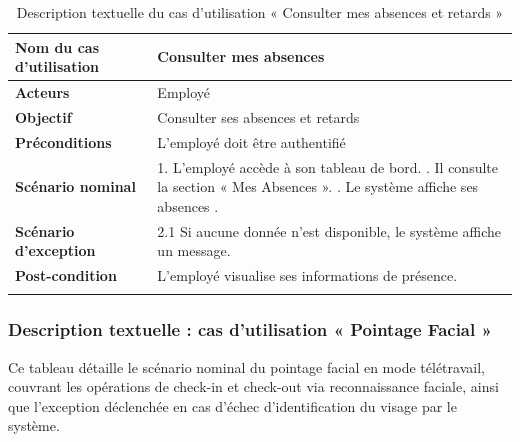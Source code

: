 \begin{center}
\begin{longtable}{|p{5cm}|p{9cm}|}
\hline
\textbf{Nom du cas d'utilisation} & \textbf{Consulter mes absences} \\ \hline
\textbf{Acteurs}                  & Employé \\ \hline
\textbf{Objectif}                 & Consulter ses absences et retards \\ \hline
\textbf{Préconditions}            & L'employé doit être authentifié \\ \hline
\textbf{Scénario nominal} &
1. L'employé accède à son tableau de bord. \newline
2. Il consulte la section « Mes Absences ». \newline
3. Le système affiche ses absences . \\ \hline
\textbf{Scénario d'exception} &
2.1 Si aucune donnée n'est disponible, le système affiche un message. \\ \hline
\textbf{Post-condition} & L'employé visualise ses informations de présence. \\ \hline
\caption{Description textuelle du cas d'utilisation « Consulter mes absences et retards »}
\end{longtable}
\end{center}

\subsubsection*{Description textuelle : cas d'utilisation « Pointage Facial »}
Ce tableau détaille le scénario nominal du pointage facial en mode télétravail, couvrant les opérations de check-in et check-out via reconnaissance faciale, ainsi que l'exception déclenchée en cas d'échec d'identification du visage par le système.


